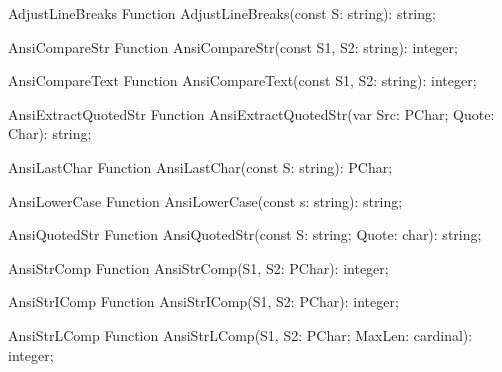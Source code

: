 \begin{function}{AdjustLineBreaks}
\Declaration
Function AdjustLineBreaks(const S: string): string;
\Description
\Errors
\SeeAlso
\end{function}

 
\begin{function}{AnsiCompareStr}
\Declaration
Function AnsiCompareStr(const S1, S2: string): integer;
\Description
\Errors
\SeeAlso
\end{function}

 
\begin{function}{AnsiCompareText}
\Declaration
Function AnsiCompareText(const S1, S2: string): integer;
\Description
\Errors
\SeeAlso
\end{function}

 
\begin{function}{AnsiExtractQuotedStr}
\Declaration
Function AnsiExtractQuotedStr(var Src: PChar; Quote: Char): string;
\Description
\Errors
\SeeAlso
\end{function}

 
\begin{function}{AnsiLastChar}
\Declaration
Function AnsiLastChar(const S: string): PChar;
\Description
\Errors
\SeeAlso
\end{function}

 
\begin{function}{AnsiLowerCase}
\Declaration
Function AnsiLowerCase(const s: string): string;
\Description
\Errors
\SeeAlso
\end{function}

 
\begin{function}{AnsiQuotedStr}
\Declaration
Function AnsiQuotedStr(const S: string; Quote: char): string;
\Description
\Errors
\SeeAlso
\end{function}

 
\begin{function}{AnsiStrComp}
\Declaration
Function AnsiStrComp(S1, S2: PChar): integer;
\Description
\Errors
\SeeAlso
\end{function}

 
\begin{function}{AnsiStrIComp}
\Declaration
Function AnsiStrIComp(S1, S2: PChar): integer;
\Description
\Errors
\SeeAlso
\end{function}

 
\begin{function}{AnsiStrLComp}
\Declaration
Function AnsiStrLComp(S1, S2: PChar; MaxLen: cardinal): integer;
\Description
\Errors
\SeeAlso
\end{function}

